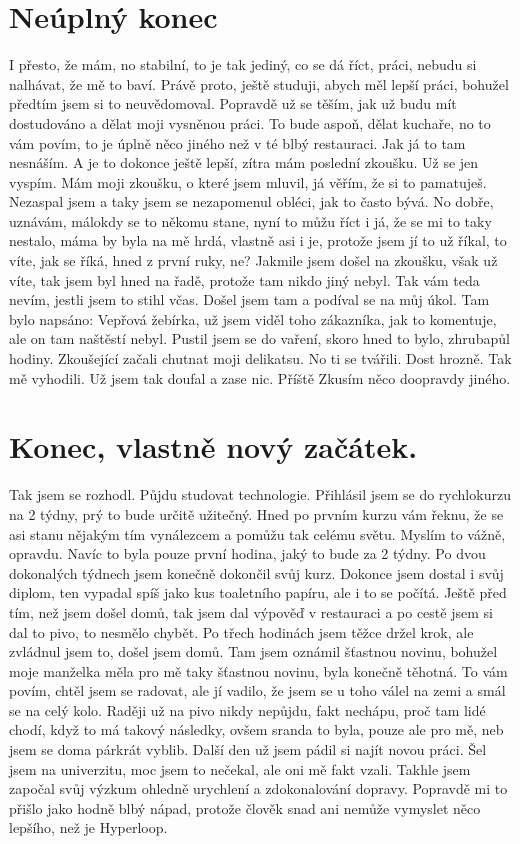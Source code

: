 \section{Neúplný konec}

I přesto, že mám, no stabilní, to je tak jediný, co se dá říct, práci, nebudu si nalhávat, že mě to baví. Právě proto, ještě studuji, abych měl lepší práci, bohužel předtím jsem si to neuvědomoval. Popravdě už se těším, jak už budu mít dostudováno a dělat moji vysněnou práci. To bude aspoň, dělat kuchaře, no to vám povím, to je úplně něco jiného než v té blbý restauraci. Jak já to tam nesnáším. A je to dokonce ještě lepší, zítra mám poslední zkoušku. Už se jen vyspím. Mám moji zkoušku, o které jsem mluvil, já věřím, že si to pamatuješ. Nezaspal jsem a taky jsem se nezapomenul obléci, jak to často bývá. No dobře, uznávám, málokdy se to někomu stane, nyní to můžu říct i já, že se mi to taky nestalo, máma by byla na mě hrdá, vlastně asi i je, protože jsem jí to už říkal, to víte, jak se říká, hned z první ruky, ne? Jakmile jsem došel na zkoušku, však už víte, tak jsem byl hned na řadě, protože tam nikdo jiný nebyl. Tak vám teda nevím, jestli jsem to stihl včas. Došel jsem tam a podíval se na můj úkol. Tam bylo napsáno: Vepřová žebírka, už jsem viděl toho zákazníka, jak to komentuje, ale on tam naštěstí nebyl. Pustil jsem se do vaření, skoro hned to bylo, zhrubapůl hodiny. Zkoušející začali chutnat moji delikatsu. No ti se tvářili. Dost hrozně. Tak mě vyhodili. Už jsem tak doufal a zase nic. Příště Zkusím něco doopravdy jiného.

\section{Konec, vlastně nový začátek.}

Tak jsem se rozhodl. Půjdu studovat technologie. Přihlásil jsem se do rychlokurzu na 2 týdny, prý to bude určitě užitečný. Hned po prvním kurzu vám řeknu, že se asi stanu nějakým tím vynálezcem a pomůžu tak celému světu. Myslím to vážně, opravdu. Navíc to byla pouze první hodina, jaký to bude za 2 týdny. Po dvou dokonalých týdnech jsem konečně dokončil svůj kurz. Dokonce jsem dostal i svůj diplom, ten vypadal spíš jako kus toaletního papíru, ale i to se počítá. Ještě před tím, než jsem došel domů, tak jsem dal výpověď v restauraci a po cestě jsem si dal to pivo, to nesmělo chybět. Po třech hodinách jsem těžce držel krok, ale zvládnul jsem to, došel jsem domů. Tam jsem oznámil šťastnou novinu, bohužel moje manželka měla pro mě taky šťastnou novinu, byla konečně těhotná. To vám povím, chtěl jsem se radovat, ale jí vadilo, že jsem se u toho válel na zemi a smál se na celý kolo. Raději už na pivo nikdy nepůjdu, fakt nechápu, proč tam lidé chodí, když to má takový následky, ovšem sranda to byla, pouze ale pro mě, neb jsem se doma párkrát vyblib. Další den už jsem pádil si najít novou práci. Šel jsem na univerzitu, moc jsem to nečekal, ale oni mě fakt vzali. Takhle jsem započal svůj výzkum ohledně urychlení a zdokonalování dopravy. Popravdě mi to přišlo jako hodně blbý nápad, protože člověk snad ani nemůže vymyslet něco lepšího, než je Hyperloop.

